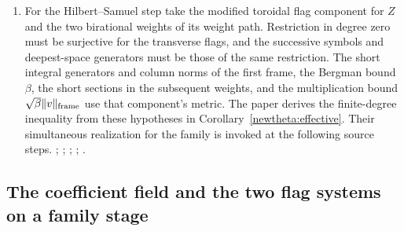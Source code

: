 \begin{enumerate}
\item For the Hilbert--Samuel step take the modified toroidal flag
component for \(Z\) and the two birational weights of its weight
path. Restriction in degree zero must be surjective for the
transverse flags, and the successive symbols and deepest-space
generators must be those of the same restriction. The short integral
generators and column norms of the first frame, the Bergman bound
\(\beta\), the short sections in the subsequent weights, and the
multiplication bound \(\sqrt\beta\|v\|_{\rm frame}\) use that
component's metric. The paper derives the finite-degree inequality
from these hypotheses in Corollary~\ref{newtheta:effective}.
Their simultaneous realization for the family is invoked at the
following source steps.
;
;
;
;
.
\end{enumerate}

\subsection{The coefficient field and the two flag systems on a family stage}
\label{zetageo:section}

